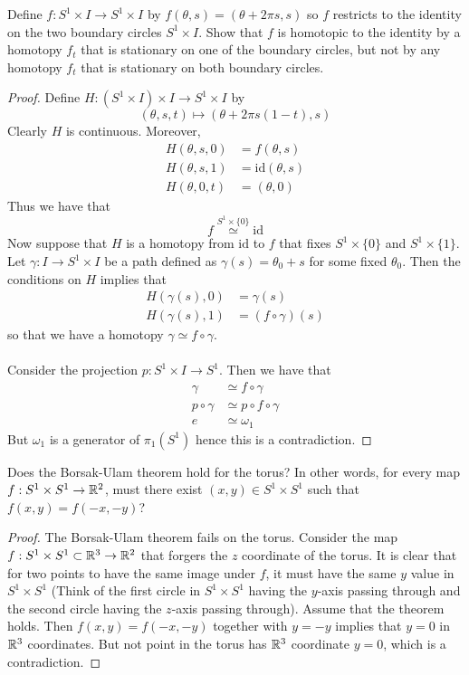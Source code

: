 \documentclass[a4paper]{article}
\begin{document}
\begin{ex}{}{} Define $f:S^1\times I\to S^1\times I$ by $f(\theta,s)=(\theta+2\pi s,s)$ so $f$ restricts to the identity on the two boundary circles $S^1\times I$. Show that $f$ is homotopic to the identity by a homotopy $f_t$ that is stationary on one of the boundary circles, but not by any homotopy $f_t$ that is stationary on both boundary circles. \tcbline
\begin{proof}
Define $H:(S^1\times I)\times I\to S^1\times I$ by $$(\theta,s,t)\mapsto(\theta+2\pi s(1-t),s)$$ Clearly $H$ is continuous. Moreover, 
\begin{align*}
H(\theta,s,0)&=f(\theta,s)\\
H(\theta,s,1)&=\text{id}(\theta,s)\\
H(\theta,0,t)&=(\theta,0)
\end{align*}
Thus we have that $$f\overset{S^1\times\{0\}}{\simeq}\text{id}$$ Now suppose that $H$ is a homotopy from $\text{id}$ to $f$ that fixes $S^1\times\{0\}$ and $S^1\times\{1\}$. Let $\gamma:I\to S^1\times I$ be a path defined as $\gamma(s)=\theta_0+s$ for some fixed $\theta_0$. Then the conditions on $H$ implies that 
\begin{align*}
H(\gamma(s),0)&=\gamma(s)\\
H(\gamma(s),1)&=(f\circ\gamma)(s)
\end{align*}
so that we have a homotopy $\gamma\simeq f\circ\gamma$. \\~\\

Consider the projection $p:S^1\times I\to S^1$. Then we have that 
\begin{align*}
\gamma&\simeq f\circ\gamma\\
p\circ\gamma&\simeq p\circ f\circ\gamma\\
e&\simeq\omega_1
\end{align*}
But $\omega_1$ is a generator of $\pi_1(S^1)$ hence this is a contradiction. 
\end{proof}
\end{ex}

\begin{ex}{}{} Does the Borsak-Ulam theorem hold for the torus? In other words, for every map $f:S^1\times S^1\to\mathbb{R}^2$, must there exist $(x,y)\in S^1\times S^1$ such that $f(x,y)=f(-x,-y)$? \tcbline
\begin{proof}
The Borsak-Ulam theorem fails on the torus. Consider the map $f:S^1\times S^1\subset\mathbb{R}^3\to\mathbb{R}^2$ that forgers the $z$ coordinate of the torus. It is clear that for two points to have the same image under $f$, it must have the same $y$ value in $S^1\times S^1$ (Think of the first circle in $S^1\times S^1$ having the $y$-axis passing  through and the second circle having the $z$-axis passing through). Assume that the theorem holds. Then $f(x,y)=f(-x,-y)$ together with $y=-y$ implies that $y=0$ in $\mathbb{R}^3$ coordinates. But not point in the torus has $\mathbb{R}^3$ coordinate $y=0$, which is a contradiction. 
\end{proof}
\end{ex}
\end{document}
